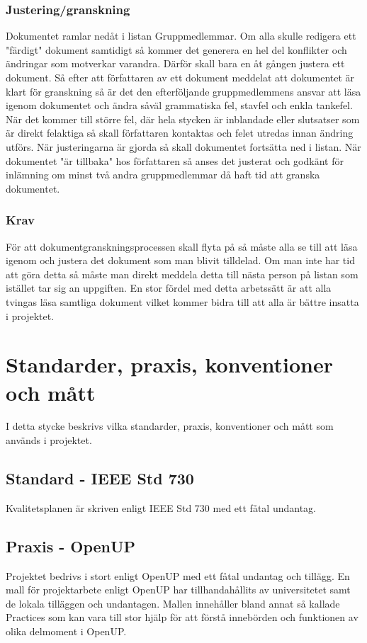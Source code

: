 \subsubsection{Justering/granskning}
Dokumentet ramlar nedåt i listan Gruppmedlemmar. Om alla skulle redigera ett "färdigt" dokument samtidigt så kommer det generera en hel del konflikter och ändringar som motverkar varandra. Därför skall bara en åt gången justera ett dokument. Så efter att författaren av ett dokument meddelat att dokumentet är klart för granskning så är det den efterföljande gruppmedlemmens ansvar att läsa igenom dokumentet och ändra såväl grammatiska fel, stavfel och enkla tankefel. När det kommer till större fel, där hela stycken är inblandade eller slutsatser som är direkt felaktiga så skall författaren kontaktas och felet utredas innan ändring utförs. När justeringarna är gjorda så skall dokumentet fortsätta ned i listan. När dokumentet "är tillbaka" hos författaren så anses det justerat och godkänt för inlämning om minst två andra gruppmedlemmar då haft tid att granska dokumentet.

\subsubsection{Krav}
För att dokumentgranskningsprocessen skall flyta på så måste alla se till att läsa igenom och justera det dokument som man blivit tilldelad. Om man inte har tid att göra detta så måste man direkt meddela detta till nästa person på listan som istället tar sig an uppgiften. En stor fördel med detta arbetssätt är att alla tvingas läsa samtliga dokument vilket kommer bidra till att alla är bättre insatta i projektet.

\section{Standarder, praxis, konventioner och mått}
I detta stycke beskrivs vilka standarder, praxis, konventioner och mått som används i projektet.

\subsection{Standard - IEEE Std 730}
Kvalitetsplanen är skriven enligt IEEE Std 730 med ett fåtal undantag.

\subsection{Praxis - OpenUP}
Projektet bedrivs i stort enligt OpenUP med ett fåtal undantag och tillägg. En mall för projektarbete enligt OpenUP har tillhandahållits av universitetet samt de lokala tilläggen och undantagen. Mallen innehåller bland annat så kallade Practices som kan vara till stor hjälp för att förstå innebörden och funktionen av olika delmoment i OpenUP.

